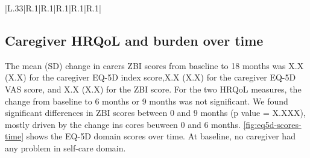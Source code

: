 \documentclass[12pt]{article}
\begin{document}
\hspace{1em}
\begin{table}[H]
    \centering \singlespacing \small
    \caption{Pooled carer ZBI, EQ-VAS, and EQ-5D utility and domain scores by King’s stage}
    \begin{tabular}{|L{.33\linewidth}|R{.1\linewidth}|R{.1\linewidth}|R{.1\linewidth}|R{.1\linewidth}|R{.1\linewidth}|}
        \hline
    \end{tabular}
    \label{tab_outcomes_kings}
    \caption*{\footnotesize 
                \textit{Notes:} Data from all caregivers at all time points (baseline, 6 months, and 9 months) have been pooled. Comparisons of outcomes between King’s stages use ANOVA. ZBI total score ranges from 0 to 88, with higher scores indicating greater burden. EQ-5D scores range from 0 to 1.0, with higher scores indicating better health-related quality of life. EQ-VAS scores range from 0 to 100, with higher scores indicate better health-related quality of life. EQ-5D domain scores range from 0 to 3, with higher scores indicating greater restriction by domain. \\
                ANOVA, analysis of variance; EQ-5D, EuroQol 5-dimension questionnaire; VAS, visual analog scale; ZBI, Zarit Burden Interview}
\end{table}

\subsection{Caregiver HRQoL and burden over time}
The mean (SD) change in carers ZBI scores from baseline to 18 months was X.X (X.X) for the caregiver EQ-5D index score,X.X (X.X) for the caregiver EQ-5D VAS score, and X.X (X.X) for the ZBI score. For the two HRQoL measures, the change from baseline to 6 months or 9 months was not significant. We found significant differences in ZBI scores between 0 and 9  months (p value = X.XXX), mostly driven by the change ins cores beuween 0 and 6 months. \autoref{fig:eq5d-scores-time} shows the EQ-5D domain scores over time. At baseline, no caregiver had any problem in self-care domain. %
\end{document}

